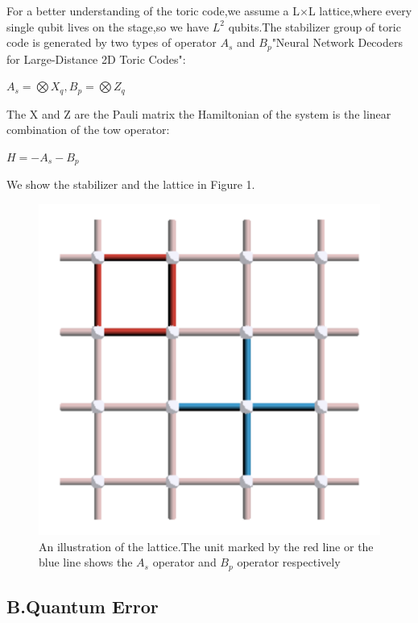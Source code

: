 \documentclass[
	a4paper, %
	10pt, %
	unnumberedsections, %
	twoside, %
]{LTJournalArticle}
\begin{document}
For a better understanding of the toric code,we assume a L$\times$L lattice,where every single qubit lives on the stage,so we have $L^2$ qubits.The stabilizer group of toric code is generated by two types of operator $A_s$ and $B_p$"Neural Network Decoders for Large-Distance 2D Toric Codes":
\begin{center}
$A_s = \bigotimes X_q,B_p = \bigotimes Z_q$
\end{center}
The X and Z are the Pauli matrix the Hamiltonian of the system is the linear combination of the tow operator:
\begin{center}
$H = -A_s-B_p$
\end{center}
We show the stabilizer and the lattice in Figure 1.
\begin{figure} %
	\setlength{\abovecaptionskip}{0.cm} %
	\setlength{\abovecaptionskip}{0.cm} 
	\includegraphics[width=\linewidth]{img/figure 1.png}
	\caption{An illustration of the lattice.The unit marked by the red line or the blue line shows the $A_s$ operator and $B_p$ operator respectively}
	\label{fig:tcanther}
\end{figure}

\subsection{B.Quantum Error}
\end{document}
